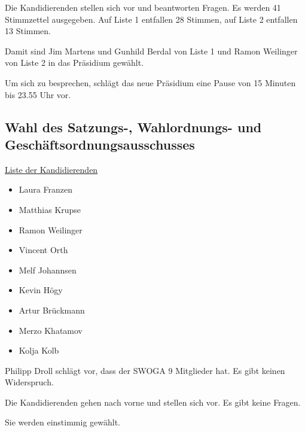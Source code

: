 \documentclass[ngerman,headheight=70pt]{scrartcl}
\begin{document}
    Die Kandidierenden stellen sich vor und beantworten Fragen.
    Es werden 41 Stimmzettel ausgegeben.
    Auf Liste 1 entfallen 28 Stimmen, auf Liste 2 entfallen 13 Stimmen.

    Damit sind Jim Martens und Gunhild Berdal von Liste 1 und Ramon Weilinger
    von Liste 2 in das Präsidium gewählt.

    Um sich zu besprechen, schlägt das neue Präsidium eine Pause von 15 Minuten
    bis 23.55 Uhr vor.

    \subsection{Wahl des Satzungs-, Wahlordnungs- und Geschäftsordnungsausschusses}

    \underline{Liste der Kandidierenden}
    \begin{itemize}
        \item Laura Franzen
        \item Matthias Krupse
        \item Ramon Weilinger
        \item Vincent Orth
        \item Melf Johannsen
        \item Kevin Högy
        \item Artur Brückmann
        \item Merzo Khatamov
        \item Kolja Kolb
    \end{itemize}

    Philipp Droll schlägt vor, dass der SWOGA 9 Mitglieder hat. Es gibt keinen
    Widerspruch.

    Die Kandidierenden gehen nach vorne und stellen sich vor. Es gibt keine
    Fragen.

    Sie werden einstimmig gewählt.
\end{document}
